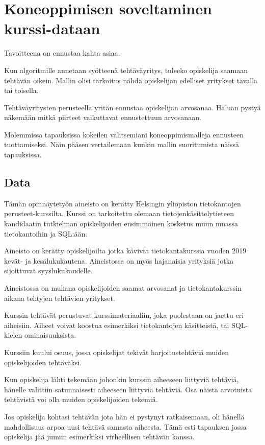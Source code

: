\documentclass[finnish,twoside,openright]{HYgraduMLDS}
\begin{document}
\chapter{Koneoppimisen soveltaminen kurssi-dataan}

Tavoitteena on ennustaa kahta asiaa. 

Kun algoritmille annetaan syötteenä tehtäväyritys, tuleeko opiskelija saamaan tehtävän oikein. Mallin olisi tarkoitus nähdä opiskelijan edelliset yritykset tavalla tai toisella.

Tehtäväyritysten perusteella yritän ennustaa opiskelijan arvosanaa. Haluan pystyä näkemään mitkä piirteet vaikuttavat ennustettuun arvosanaan.

Molemmissa tapauksissa kokeilen valitsemiani koneoppimismalleja ennusteen tuottamiseksi. Näin pääsen vertailemaan kunkin mallin suoritumista näissä tapauksissa.


\section{Data}

Tämän opinnäytetyön aineisto on kerätty Helsingin yliopiston tietokantojen perusteet-kurssilta\cite{tikape2019}. Kurssi on tarkoitettu olemaan tietojenkäsittelytieteen kandidaatin tutkielman opiskelijoiden ensimmäinen kosketus muun muassa tietokantoihin ja SQL:ään\cite{tikape2019}.

Aineisto on kerätty opiskelijoilta jotka kävivät tietokantakurssia vuoden 2019 kevät- ja kesälukukautena. Aineistossa on myös hajanaisia yrityksiä jotka sijoittuvat syyslukukaudelle.

Aineistossa on mukana opiskelijoiden saamat arvosanat ja tietokantakurssin aikana tehtyjen tehtävien yritykset.

Kurssin tehtävät perustuvat kurssimateriaaliin, joka puolestaan on jaettu eri aiheisiin. Aiheet voivat koostua esimerkiksi tietokantojen käsitteistä, tai SQL-kielen ominaisuuksista.

Kurssiin kuului osuus, jossa opiskelijat tekivät harjoitustehtäviä muiden opiskelijoiden tehtäväksi.

Kun opiskelija lähti tekemään johonkin kurssin aiheeseen liittyviä tehtäviä, hänelle valittiin satunnaisesti aiheeseen liittyviä tehtäviä. Osa näistä arvotuista tehtävistä voi olla muiden opiskelijoiden tekemiä.

Jos opiskelija kohtasi tehtävän jota hän ei pystynyt ratkaisemaan, oli hänellä mahdollisuus arpoa uusi tehtävä samasta aiheesta. Tämä esti tapauksen jossa opiskelija jää jumiin esimerkiksi virheellisen tehtävän kanssa.
\end{document}
